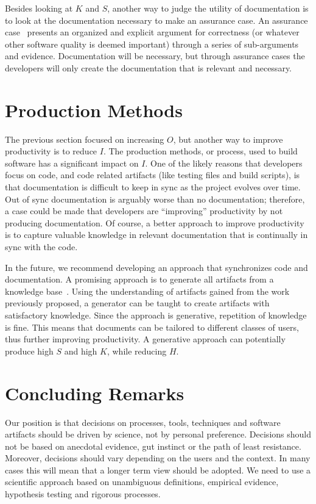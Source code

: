 \documentclass[sigconf, authorversion, nonacm]{acmart}
\begin{document}
Besides looking at $K$ and $S$, another way to judge the utility of
documentation is to look at the documentation necessary to make an assurance
case. An assurance case~\cite{RinehartEtAl2015} presents an organized and
explicit argument for correctness (or whatever other software quality is deemed
important) through a series of sub-arguments and evidence.  Documentation will
be necessary, but through assurance cases the developers will only create the
documentation that is relevant and necessary. %

\section{Production Methods}

The previous section focused on increasing $O$, but another way to improve
productivity is to reduce $I$.  The production methods, or process, used to
build software has a significant impact on $I$.  One of the likely reasons that
developers focus on code, and code related artifacts (like testing files and
build scripts), is that documentation is difficult to keep in sync as the
project evolves over time.  Out of sync documentation is arguably worse than no
documentation; therefore, a case could be made that developers are ``improving''
productivity by not producing documentation.  Of course, a better approach to
improve productivity is to capture valuable knowledge in relevant documentation
that is continually in sync with the code.

In the future, we recommend developing an approach that synchronizes code and
documentation.  A promising approach is to generate all artifacts from a
knowledge base~\cite{SzymczakEtAl2016}.  Using the understanding of artifacts
gained from the work previously proposed, a generator can be taught to create
artifacts with satisfactory knowledge. Since the approach is generative,
repetition of knowledge is fine.  This means that documents can be tailored to
different classes of users, thus further improving productivity.  A generative
approach can potentially produce high $S$ and high $K$, while reducing $H$.

\section{Concluding Remarks}

Our position is that decisions on processes, tools, techniques and software
artifacts should be driven by science, not by personal preference.  Decisions
should not be based on anecdotal evidence, gut instinct or the path of least
resistance.  Moreover, decisions should vary depending on the users and the
context.  In many cases this will mean that a longer term view should be
adopted.  We need to use a scientific approach based on unambiguous definitions,
empirical evidence, hypothesis testing and rigorous processes.
\end{document}
